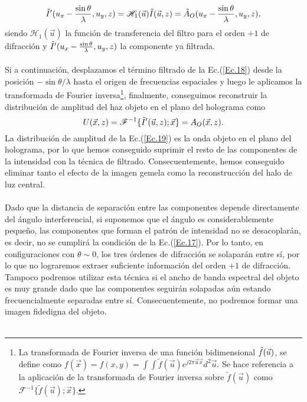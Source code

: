 \documentclass[12pt]{article}
\begin{document}
\begin{equation}
    \Tilde{I}'(u_x - \frac{\sin{\theta}}{\lambda}, u_y, z) = \mathscr{H}_1 (\Vec{u}) \Tilde{I} (\Vec{u}, z) = \tilde{A}_O (u_x - \frac{\sin{\theta}}{\lambda}, u_y,z),
    \label{Ec.18}
\end{equation}
siendo $\mathscr{H}_1 (\Vec{u})$  la función de transferencia del filtro para el orden $+1$ de difracción  y  $\Tilde{I}'(u_x - \frac{\sin{\theta}}{\lambda}, u_y, z)$ la componente ya filtrada. \\ \\
Si a continuación, desplazamos el término filtrado de la Ec.(\ref{Ec.18}) desde la posición $ -\sin{\theta}/\lambda$  hasta el origen  de frecuencias espaciales y luego le aplicamos la transformada de Fourier inversa\footnote{La transformada de Fourier inversa de una función bidimensional $\Tilde{f}(\Vec{u})$, se define como $f (\Vec{x}) = f (x,y) = \int \int \tilde{f}(\Vec{u}) e^{ j 2 \pi\Vec{u} \vec{x}} d^{2}\Vec{u}$. Se hace referencia  a la aplicación de la transformada de Fourier inversa sobre $\tilde{f} (\Vec{u})$ como $\mathscr{F}^{-1} \{ \tilde{f} (\Vec{u}) ; \Vec{x}\}$.}, finalmente, conseguimos reconstruir la distribución de amplitud del haz objeto  en el plano del holograma como
\begin{equation}
    U (\Vec{x}, z) = \mathscr{F}^{-1}\{\Tilde{I}'(\Vec{u},z); \vec{x} \} = A_O (\vec{x}, z).
    \label{Ec.19}
\end{equation}
La distribución de amplitud de la Ec.(\ref{Ec.19}) es la onda objeto en el plano del holograma, por lo que hemos conseguido suprimir el resto de las componentes de la intensidad con la técnica de filtrado. Consecuentemente, hemos conseguido eliminar tanto el efecto  de la imagen gemela como la reconstrucción del halo de luz central. \\ \\
Dado que la distancia de separación entre las componentes depende directamente  del ángulo interferencial, si suponemos que el ángulo es considerablemente pequeño, las componentes que forman el patrón de intensidad no se desacoplarán, es decir, no se cumplirá la condición de la Ec.(\ref{Ec.17}).  Por lo tanto, en configuraciones con $\theta \sim 0$, los tres órdenes de difracción se solaparán entre sí, por lo que no lograremos extraer suficiente información del orden $+1$ de difracción. Tampoco podremos utilizar esta técnica si el ancho de banda espectral del objeto es muy grande dado que las componentes seguirán solapadas aún estando frecuencialmente separadas entre sí. Consecuentemente, no podremos formar una imagen fidedigna del objeto.\\ \\
\end{document}
